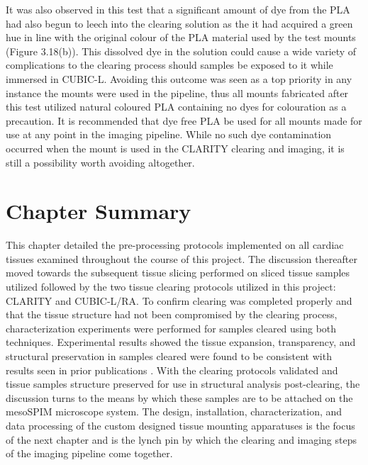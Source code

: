 It was also observed in this test that a significant amount of dye from the PLA had also begun to leech into the clearing solution as the it had acquired a green hue in line with the original colour of the PLA material used by the test mounts (Figure 3.18(b)). This dissolved dye in the solution could cause a wide variety of complications to the clearing process should samples be exposed to it while immersed in CUBIC-L. Avoiding this outcome was seen as a top priority in any instance the mounts were used in the pipeline, thus all mounts fabricated after this test utilized natural coloured PLA containing no dyes for colouration as a precaution. It is recommended that dye free PLA be used for all mounts made for use at any point in the imaging pipeline. While no such dye contamination occurred when the mount is used in the CLARITY clearing and imaging, it is still a possibility worth avoiding altogether. 

\section{Chapter Summary}

This chapter detailed the pre-processing protocols implemented on all cardiac tissues examined throughout the course of this project. The discussion thereafter moved towards the subsequent tissue slicing performed on sliced tissue samples utilized followed by the two tissue clearing protocols utilized in this project: CLARITY and CUBIC-L/RA. To confirm clearing was completed properly and that the tissue structure had not been compromised by the clearing process, characterization experiments were performed for samples cleared using both techniques. Experimental results showed the tissue expansion, transparency, and structural preservation in samples cleared were found to be consistent with results seen in prior publications \cite{olianti_optical_2021, sands_its_2022, epp_optimization_2015, giardini_mesoscopic_2021}. With the clearing protocols validated and tissue samples structure preserved for use in structural analysis post-clearing, the discussion turns to the means by which these samples are to be attached on the mesoSPIM microscope system. The design, installation, characterization, and data processing of the custom designed tissue mounting apparatuses is the focus of the next chapter and is the lynch pin by which the clearing and imaging steps of the imaging pipeline come together.



